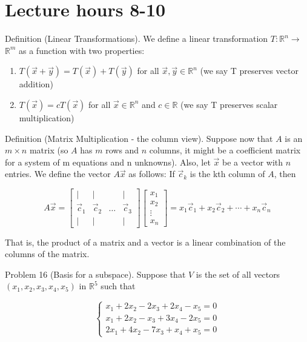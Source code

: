 \documentclass[10pt]{article}
\begin{document}
\section*{Lecture hours 8-10}
Definition (Linear Transformations). We define a linear transformation $T: \mathbb{R}^{n} \rightarrow$ $\mathbb{R}^{m}$ as a function with two properties:

\begin{enumerate}
  \item $T(\vec{x}+\vec{y})=T(\vec{x})+T(\vec{y})$ for all $\vec{x}, \vec{y} \in \mathbb{R}^{n}$ (we say T preserves vector addition)
  \item $T(\vec{x})=c T(\vec{x})$ for all $\vec{x} \in \mathbb{R}^{n}$ and $c \in \mathbb{R}$ (we say T preserves scalar multiplication)
\end{enumerate}

Definition (Matrix Multiplication - the column view). Suppose now that $A$ is an $m \times n$ matrix (so $A$ has $m$ rows and $n$ columns, it might be a coefficient matrix for a system of m equations and n unknowns). Also, let $\vec{x}$ be a vector with $n$ entries. We define the vector $A \vec{x}$ as follows: If $\vec{c}_{k}$ is the kth column of $A$, then

$$
A \vec{x}=\left[\begin{array}{cccc}
\mid & \mid & & \mid \\
\vec{c}_{1} & \vec{c}_{2} & \ldots & \vec{c}_{3} \\
\mid & \mid & & \mid
\end{array}\right]\left[\begin{array}{c}
x_{1} \\
x_{2} \\
\vdots \\
x_{n}
\end{array}\right]=x_{1} \vec{c}_{1}+x_{2} \vec{c}_{2}+\cdots+x_{n} \vec{c}_{n}
$$

That is, the product of a matrix and a vector is a linear combination of the columns of the matrix.

Problem 16 (Basis for a subspace). Suppose that $V$ is the set of all vectors $\left(x_{1}, x_{2}, x_{3}, x_{4}, x_{5}\right)$ in $\mathbb{R}^{5}$ such that

\[
\left\{\begin{array}{l}
x_{1}+2 x_{2}-2 x_{3}+2 x_{4}-x_{5}=0  \tag{4.1}\\
x_{1}+2 x_{2}-x_{3}+3 x_{4}-2 x_{5}=0 \\
2 x_{1}+4 x_{2}-7 x_{3}+x_{4}+x_{5}=0
\end{array}\right.
\]
\end{document}
